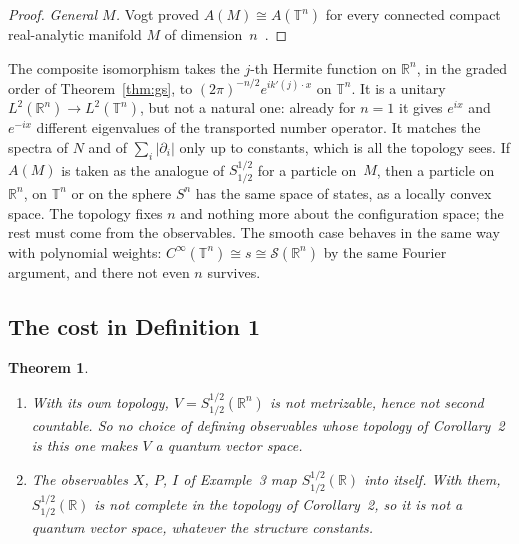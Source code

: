 \documentclass[11pt]{article}
\newtheorem{theorem}{Theorem}[section]
\theoremstyle{definition}
\begin{document}
\begin{proof}
  \emph{General $M$.} Vogt proved $A(M) \cong A(\mathbb T^n)$ for every connected compact
  real-analytic manifold $M$ of dimension~$n$~\cite[Cor.~4.12]{domanski}.
\end{proof}

The composite isomorphism takes the $j$-th Hermite function on $\mathbb R^n$, in the graded order
of Theorem~\ref{thm:gs}, to $(2\pi)^{-n/2}e^{ik'(j)\cdot x}$ on $\mathbb T^n$. It is a unitary
$L^2(\mathbb R^n) \to L^2(\mathbb T^n)$, but not a natural one: already for $n = 1$ it gives
$e^{ix}$ and $e^{-ix}$ different eigenvalues of the transported number operator. It matches the
spectra of $N$ and of $\sum_i |\partial_i|$ only up to constants, which is all the topology sees.
If $A(M)$ is taken as the analogue of $S^{1/2}_{1/2}$ for a particle on~$M$, then a particle on
$\mathbb R^n$, on $\mathbb T^n$ or on the sphere $S^n$ has the same space of states, as a locally
convex space. The topology fixes $n$ and nothing more about
the configuration space; the rest must come from the observables. The smooth case behaves in
the same way with polynomial weights: $C^\infty(\mathbb T^n) \cong s \cong \mathcal S(\mathbb R^n)$
by the same Fourier argument, and there not even $n$ survives.

\subsection{The cost in Definition 1}

\begin{theorem}\label{thm:gs-def1}
  \begin{enumerate}
    \item With its own topology, $V = S^{1/2}_{1/2}(\mathbb R^n)$ is not metrizable, hence not
      second countable. So no choice of defining observables whose topology of Corollary~2 is
      this one makes $V$ a quantum vector space.
    \item The observables $X$, $P$, $I$ of Example~3 map $S^{1/2}_{1/2}(\mathbb R)$ into itself.
      With them, $S^{1/2}_{1/2}(\mathbb R)$ is not complete in the topology of Corollary~2, so it
      is not a quantum vector space, whatever the structure constants.
  \end{enumerate}
\end{theorem}
\end{document}
